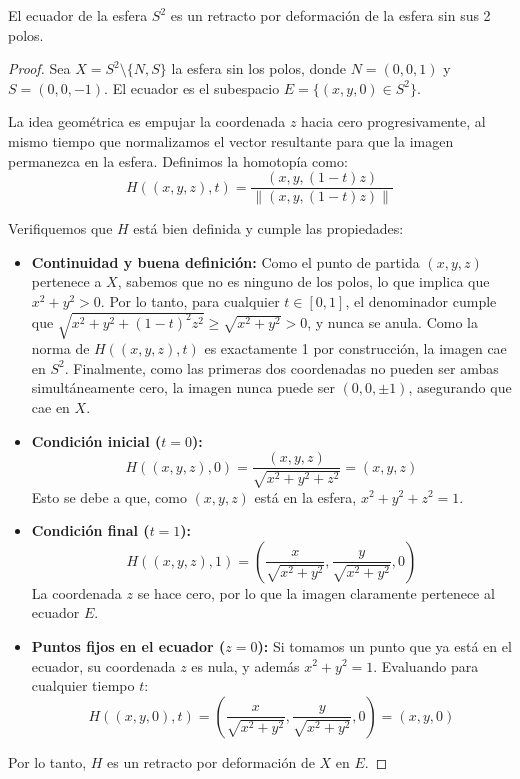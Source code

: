 \documentclass{article}
\theoremstyle{plain}
\theoremstyle{definition}
\newenvironment{ejercicio}[1]{\begin{trivlist}
\item[\hskip \labelsep {\bfseries Ejercicio}\hskip \labelsep {\bfseries #1.}]}{\end{trivlist}}
\begin{document}
\begin{ejercicio}{9}
    El ecuador de la esfera \( S^{2} \) es un retracto por deformación de la esfera sin sus 2 polos.
\end{ejercicio}
\begin{proof}
    Sea \( X = S^2 \setminus \{N, S\} \) la esfera sin los polos, donde \( N = (0,0,1) \) y \( S = (0,0,-1) \).
    El ecuador es el subespacio \( E = \{ (x,y,0) \in S^2 \} \).

    La idea geométrica es empujar la coordenada \( z \) hacia cero progresivamente, al mismo tiempo que normalizamos el vector resultante para que la imagen permanezca en la esfera. Definimos la homotopía como:
    \[
        H((x,y,z), t) = \frac{ (x, y, (1-t)z) }{ \left \| (x, y, (1-t)z) \right \| }
    \]

    Verifiquemos que \( H \) está bien definida y cumple las propiedades:
    \begin{itemize}
        \item \textbf{Continuidad y buena definición:} Como el punto de partida \( (x,y,z) \) pertenece a \( X \), sabemos que no es ninguno de los polos, lo que implica que \( x^2 + y^2 > 0 \). Por lo tanto, para cualquier \( t \in [0,1] \), el denominador cumple que \( \sqrt{x^2+y^2+(1-t)^2z^2} \ge \sqrt{x^2+y^2} > 0 \), y nunca se anula. Como la norma de \( H((x,y,z),t) \) es exactamente 1 por construcción, la imagen cae en \( S^2 \). Finalmente, como las primeras dos coordenadas no pueden ser ambas simultáneamente cero, la imagen nunca puede ser \( (0,0,\pm 1) \), asegurando que cae en \( X \).

        \item \textbf{Condición inicial (\( t=0 \)):}
              \[ H((x,y,z), 0) = \frac{(x,y,z)}{\sqrt{x^2+y^2+z^2}} = (x,y,z) \]
              Esto se debe a que, como \( (x,y,z) \) está en la esfera, \( x^2+y^2+z^2 = 1 \).

        \item \textbf{Condición final (\( t=1 \)):}
              \[ H((x,y,z), 1) = \left( \frac{x}{\sqrt{x^2+y^2}}, \frac{y}{\sqrt{x^2+y^2}}, 0 \right) \]
              La coordenada \( z \) se hace cero, por lo que la imagen claramente pertenece al ecuador \( E \).

        \item \textbf{Puntos fijos en el ecuador (\( z=0 \)):} Si tomamos un punto que ya está en el ecuador, su coordenada \( z \) es nula, y además \( x^2+y^2=1 \). Evaluando para cualquier tiempo \( t \):
              \[ H((x,y,0), t) = \left( \frac{x}{\sqrt{x^2+y^2}}, \frac{y}{\sqrt{x^2+y^2}}, 0 \right) = (x,y,0) \]
    \end{itemize}
    Por lo tanto, \( H \) es un retracto por deformación de \( X \) en \( E \).
\end{proof}
\end{document}
